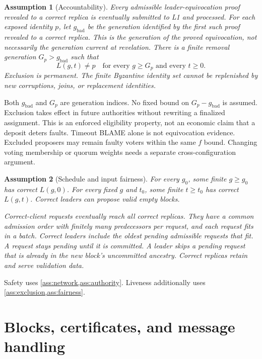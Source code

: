 \documentclass[11pt,a4paper]{article}
\newtheorem{assumption}[assumption]{Assumption}
\begin{document}
\begin{assumption}[Accountability]
\label{ass:exclusion}
Every admissible leader-equivocation proof revealed to a correct replica
is eventually submitted to L1 and processed. For each exposed identity $p$,
let $g_{\mathrm{bad}}$ be the generation identified by the first such proof
revealed to a correct replica. This is the generation of the proved
equivocation, not necessarily the generation current at revelation.
There is a finite removal generation $G_p>g_{\mathrm{bad}}$ such that
\[
 L(g,t)\ne p\quad\text{for every }g\ge G_p\text{ and every }t\ge0.
\]
Exclusion is permanent. The finite Byzantine identity set cannot be
replenished by new corruptions, joins, or replacement identities.
\end{assumption}
Both $g_{\mathrm{bad}}$ and $G_p$ are generation indices. No fixed bound
on $G_p-g_{\mathrm{bad}}$ is assumed. Exclusion takes effect in future
authorities without rewriting a finalized assignment.
This is an enforced eligibility property, not an economic claim that a
deposit deters faults. Timeout BLAME alone is not equivocation evidence.
Excluded proposers may remain faulty voters within the same $f$ bound.
Changing voting membership or quorum weights needs a separate
cross-configuration argument.

\begin{assumption}[Schedule and input fairness]
\label{ass:fairness}
For every $g_0$, some finite $g\ge g_0$ has correct $L(g,0)$.
For every fixed $g$ and $t_0$, some finite $t\ge t_0$ has correct $L(g,t)$.
Correct leaders can propose valid empty blocks.

Correct-client requests eventually reach all correct replicas. They have
a common admission order with finitely many predecessors per request, and
each request fits in a batch. Correct leaders include the oldest pending
admissible requests that fit.  A request stays pending until
it is committed. A leader skips a pending request that is already in the
new block's uncommitted ancestry. Correct replicas retain and serve
validation data.
\end{assumption}
Safety uses \cref{ass:network,ass:authority}. Liveness additionally
uses \cref{ass:exclusion,ass:fairness}.

\section{Blocks, certificates, and message handling}
\label{sec:definitions}
\end{document}
